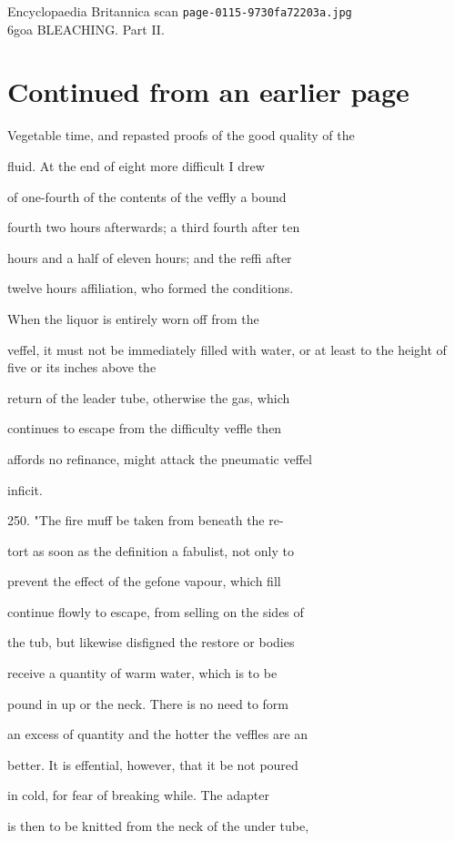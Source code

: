 \documentclass{article}
\begin{document}
\begin{center}
{\Large Encyclopaedia Britannica scan \texttt{page-0115-9730fa72203a.jpg}}\\[0.5em]
6goa BLEACHING. Part II.
\end{center}
\section*{Continued from an earlier page}
Vegetable time, and repasted proofs of the good quality of the

fluid. At the end of eight more difficult I drew

of one-fourth of the contents of the veffly a bound

fourth two hours afterwards; a third fourth after ten

hours and a half of eleven hours; and the reffi after

twelve hours affiliation, who formed the conditions.

When the liquor is entirely worn off from the

veffel, it must not be immediately filled with water, or at least to the height of five or its inches above the

return of the leader tube, otherwise the gas, which

continues to escape from the difficulty veffle then

affords no refinance, might attack the pneumatic veffel

inficit.

250. "The fire muff be taken from beneath the re-

tort as soon as the definition a fabulist, not only to

prevent the effect of the gefone vapour, which fill

continue flowly to escape, from selling on the sides of

the tub, but likewise disfigned the restore or bodies

receive a quantity of warm water, which is to be

pound in up or the neck. There is no need to form

an excess of quantity and the hotter the veffles are an

better. It is effential, however, that it be not poured

in cold, for fear of breaking while. The adapter

is then to be knitted from the neck of the under tube,
\end{document}
